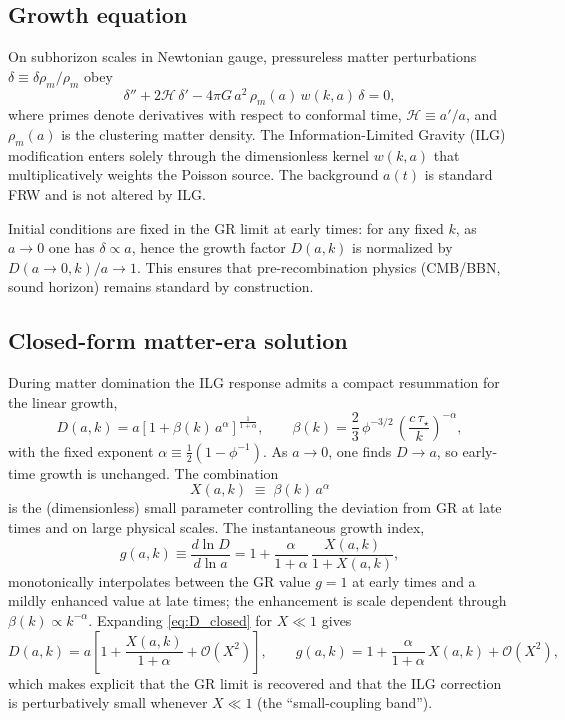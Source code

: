 \documentclass[11pt]{article}
\begin{document}
\subsection{Growth equation}
On subhorizon scales in Newtonian gauge, pressureless matter perturbations $\delta \equiv \delta\rho_{m}/\rho_{m}$ obey
\begin{equation}
\delta'' + 2\mathcal{H}\,\delta' - 4\pi G\,a^2\,\rho_m(a)\,w(k,a)\,\delta = 0,
\label{eq:growth_conf}
\end{equation}
where primes denote derivatives with respect to conformal time, $\mathcal{H}\equiv a'/a$, and $\rho_{m}(a)$ is the clustering matter density. The Information-Limited Gravity (ILG) modification enters solely through the dimensionless kernel $w(k,a)$ that multiplicatively weights the Poisson source. The background $a(t)$ is standard FRW and is not altered by ILG.

Initial conditions are fixed in the GR limit at early times: for any fixed $k$, as $a\to 0$ one has $\delta\propto a$, hence the growth factor $D(a,k)$ is normalized by $D(a\!\to\! 0,k)/a\to 1$. This ensures that pre-recombination physics (CMB/BBN, sound horizon) remains standard by construction.

\subsection{Closed-form matter-era solution}
During matter domination the ILG response admits a compact resummation for the linear growth,
\begin{equation}
D(a,k) = a\left[1+\beta(k)\,a^{\alpha}\right]^{\frac{1}{1+\alpha}},
\qquad
\beta(k)=\frac{2}{3}\,\phi^{-3/2}\,\left(\frac{c\,\tau_\star}{k}\right)^{-\alpha},
\label{eq:D_closed}
\end{equation}
with the fixed exponent $\alpha\equiv\frac{1}{2}\!\left(1-\phi^{-1}\right)$. As $a\to 0$, one finds $D\to a$, so early-time growth is unchanged. The combination
$$
X(a,k) \;\equiv\; \beta(k)\,a^{\alpha}
$$
is the (dimensionless) small parameter controlling the deviation from GR at late times and on large physical scales. The instantaneous growth index,
\begin{equation}
g(a,k) \equiv \frac{d\ln D}{d\ln a}
= 1 + \frac{\alpha}{1+\alpha}\,\frac{X(a,k)}{1+X(a,k)},
\label{eq:g_index}
\end{equation}
monotonically interpolates between the GR value $g=1$ at early times and a mildly enhanced value at late times; the enhancement is scale dependent through $\beta(k)\propto k^{-\alpha}$. Expanding \eqref{eq:D_closed} for $X\ll 1$ gives
\begin{equation}
D(a,k) = a\left[1+\frac{X(a,k)}{1+\alpha}+\mathcal{O}\!\left(X^2\right)\right],
\qquad
g(a,k) = 1 + \frac{\alpha}{1+\alpha}\,X(a,k)+\mathcal{O}\!\left(X^2\right),
\end{equation}
which makes explicit that the GR limit is recovered and that the ILG correction is perturbatively small whenever $X\ll 1$ (the ``small-coupling band'').
\end{document}
